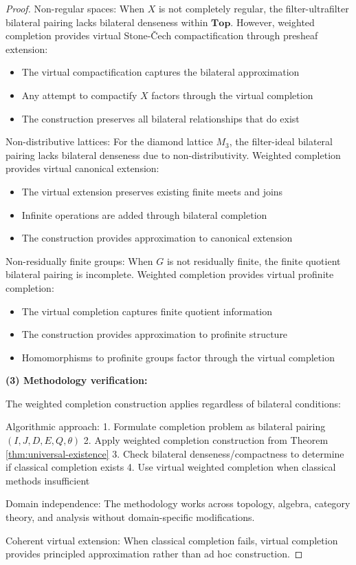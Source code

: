 \documentclass[11pt]{article}
\theoremstyle{plain}
\theoremstyle{definition}
\theoremstyle{remark}
\begin{document}
\begin{proof}
Non-regular spaces: When $X$ is not completely regular, the filter-ultrafilter bilateral pairing lacks bilateral denseness within $\mathbf{Top}$. However, weighted completion provides virtual Stone-\v{C}ech compactification through presheaf extension:
\begin{itemize}
\item The virtual compactification captures the bilateral approximation
\item Any attempt to compactify $X$ factors through the virtual completion
\item The construction preserves all bilateral relationships that do exist
\end{itemize}

Non-distributive lattices: For the diamond lattice $M_3$, the filter-ideal bilateral pairing lacks bilateral denseness due to non-distributivity. Weighted completion provides virtual canonical extension:
\begin{itemize}
\item The virtual extension preserves existing finite meets and joins
\item Infinite operations are added through bilateral completion
\item The construction provides approximation to canonical extension
\end{itemize}

Non-residually finite groups: When $G$ is not residually finite, the finite quotient bilateral pairing is incomplete. Weighted completion provides virtual profinite completion:
\begin{itemize}
\item The virtual completion captures finite quotient information  
\item The construction provides approximation to profinite structure
\item Homomorphisms to profinite groups factor through the virtual completion
\end{itemize}

\textbf{(3) Methodology verification:}

The weighted completion construction applies regardless of bilateral conditions:

Algorithmic approach:
1. Formulate completion problem as bilateral pairing $(I, J, D, E, Q, \theta)$
2. Apply weighted completion construction from Theorem \ref{thm:universal-existence}
3. Check bilateral denseness/compactness to determine if classical completion exists
4. Use virtual weighted completion when classical methods insufficient

Domain independence: The methodology works across topology, algebra, category theory, and analysis without domain-specific modifications.

Coherent virtual extension: When classical completion fails, virtual completion provides principled approximation rather than ad hoc construction.
\end{proof}
\end{document}
